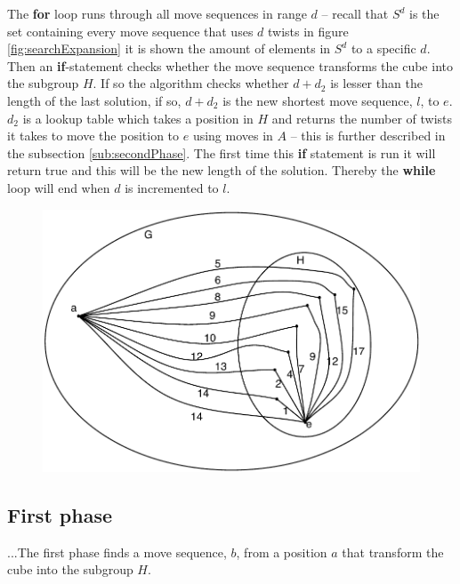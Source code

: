 The \textbf{for} loop runs through all move sequences in range $d$ -- recall that $S^d$ is the set containing every move sequence that uses $d$ twists in figure \ref{fig:searchExpansion} it is shown the amount of elements in $S^d$ to a specific $d$. Then an \textbf{if}-statement checks whether the move sequence transforms the cube into the subgroup $H$. If so the algorithm checks whether $d + d_2$ is lesser than the length of the last solution, if so, $d + d_2$ is the new shortest move sequence, $l$, to $e$. $d_2$ is a lookup table which takes a position in $H$ and returns the number of twists it takes to move the position to $e$ using moves in $A$ -- this is further described in the subsection \ref{sub:secondPhase}. The first time this \textbf{if} statement is run it will return true and this will be the new length of the solution. Thereby the \textbf{while} loop will end when $d$ is incremented to $l$.
\begin{figure}[htb]
	\centering
		\includegraphics[scale=0.75]{input/pics/kocieambe2.pdf}
	\caption{}
	\label{fig:kocieambe2}
\end{figure}

\subsection{First phase}
\label{sub:firstPhase}
...The first phase finds a move sequence, $b$,  from a position $a$ that transform the cube into the subgroup $H$.


